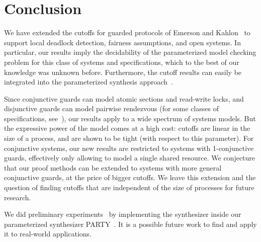 \section{Conclusion} \label{gua:sec:concl}

We have extended the cutoffs for guarded protocols of Emerson and 
Kahlon~\cite{Emerson00} to support local deadlock detection, fairness 
assumptions, and open systems.
In particular, our results imply the decidability of the parameterized model checking problem for this class of systems and specifications,
which to the best of our knowledge was unknown before. 
Furthermore, the cutoff results can easily be integrated into 
the parameterized synthesis approach~\cite{JB14}.


Since conjunctive guards can model atomic sections and read-write locks, 
and disjunctive guards can model pairwise rendezvous 
(for some classes of specifications, see~\cite{EmersonK03}), 
our results apply to a wide spectrum of systems models.
But the expressive power of the model %
comes at a high cost: cutoffs are linear in the size of a process, and 
are shown to be tight (with respect to this parameter).
For conjunctive systems, our new results are restricted to systems with
1-conjunctive guards, effectively only allowing to model a single shared
resource. 
We conjecture that our proof methods can be extended to systems with
more general conjunctive guards, at the price of bigger cutoffs.
We leave this extension and the question of finding cutoffs that are independent of the size of processes for future research.

We did preliminary experiments~\cite{SimonThesis} by implementing the synthesizer inside our parameterized synthesizer PARTY~\cite{party}.
It is a possible future work to find and apply it to real-world applications.
%
%

